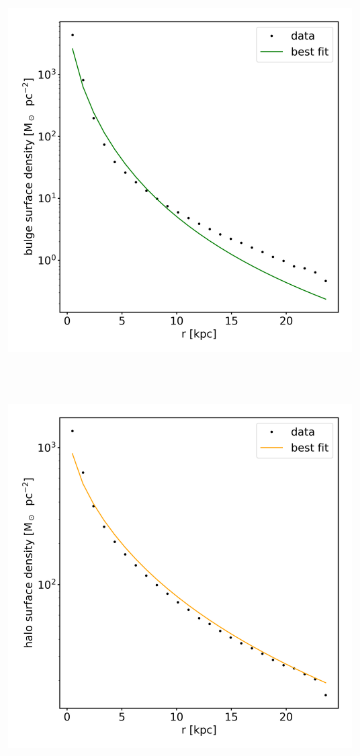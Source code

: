 \begin{figure}
\begin{subfigure}[b]{0.3\textwidth}
    	\includegraphics[width=\textwidth]{plots/Auriga/surface_dens_spher_fit_data.png}
    	\label{fig:spher_surfdens_fit}
    \end{subfigure}
    ~ %
    \begin{subfigure}[b]{0.3\textwidth}
    \centering
    	\includegraphics[width=\textwidth]{plots/Auriga/surface_dens_halo_fit_data.png}
    	\label{fig:halo_surfdens_fit}
    \end{subfigure}
    

\end{figure}
